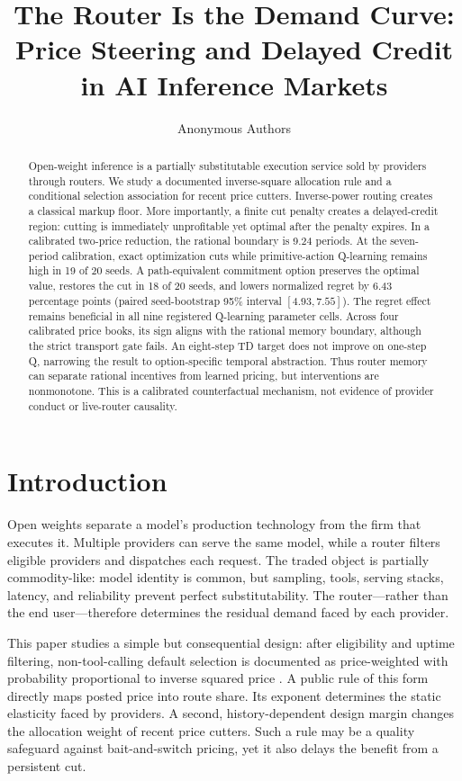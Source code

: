 \documentclass[11pt]{article}
\title{The Router Is the Demand Curve:\\
Price Steering and Delayed Credit in AI Inference Markets}
\author{Anonymous Authors}
\date{}
\newcommand{\1}{\mathbf{1}}
\begin{document}
\maketitle

\begin{abstract}
Open-weight inference is a partially substitutable execution service sold by
providers through routers.  We study a documented inverse-square allocation
rule and a conditional selection association for recent price cutters.
Inverse-power routing creates a classical markup floor.  More importantly, a
finite cut penalty creates a delayed-credit region: cutting is immediately
unprofitable yet optimal after the penalty expires.  In a calibrated two-price
reduction, the rational boundary is 9.24 periods.  At the seven-period
calibration, exact optimization cuts while primitive-action Q-learning remains
high in 19 of 20 seeds.  A path-equivalent commitment option preserves the
optimal value, restores the cut in 18 of 20 seeds, and lowers normalized regret
by 6.43 percentage points (paired seed-bootstrap 95\% interval
$[4.93,7.55]$).  The regret effect remains beneficial in all nine registered
Q-learning parameter cells.  Across four calibrated price books, its sign
aligns with the rational memory boundary, although the strict transport gate
fails.  An eight-step TD target does not improve on one-step Q, narrowing the
result to option-specific temporal abstraction.  Thus router memory can
separate rational incentives from learned
pricing, but interventions are nonmonotone.  This is a calibrated
counterfactual mechanism, not evidence of provider conduct or live-router
causality.
\end{abstract}

\section{Introduction}

Open weights separate a model's production technology from the firm that
executes it.  Multiple providers can serve the same model, while a router
filters eligible providers and dispatches each request.  The traded object is
partially commodity-like: model identity is common, but sampling, tools,
serving stacks, latency, and reliability prevent perfect substitutability.
The router---rather than the end user---therefore determines the residual
demand faced by each provider.

This paper studies a simple but consequential design: after eligibility and
uptime filtering, non-tool-calling default selection is documented as
price-weighted with probability proportional to inverse squared price
\citep{openrouter2026}.  A public rule of this form directly
maps posted price into route share.  Its exponent determines the static
elasticity faced by providers.  A second, history-dependent design margin
changes the allocation weight of recent price cutters.  Such a rule may be a
quality safeguard against bait-and-switch pricing, yet it also delays the
benefit from a persistent cut.
\end{document}
